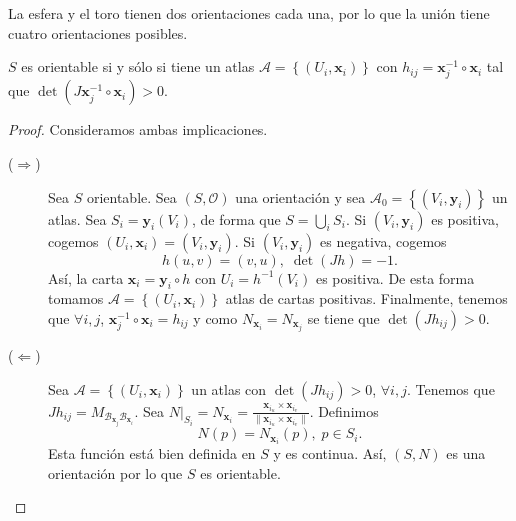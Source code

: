 \begin{observation}
La esfera y el toro tienen dos orientaciones cada una, por lo que la unión tiene cuatro orientaciones posibles. 
\end{observation}
\begin{theorem}
	$\displaystyle S $ es orientable si y sólo si tiene un atlas $\displaystyle \mathcal{A} = \left\{ \left(U_{i}, \textbf{x} _{i}\right)\right\}  $ con $\displaystyle h_{ij}= \textbf{x} _{j}^{-1}\circ \textbf{x} _{i} $ tal que $\displaystyle \det\left(J \textbf{x} _{j}^{-1} \circ \textbf{x} _{i}\right)>0 $.
\end{theorem}

\begin{proof}
Consideramos ambas implicaciones. 
\begin{description}
	\item[($\displaystyle \Rightarrow $)] Sea $\displaystyle S $ orientable. Sea $\displaystyle \left(S, \mathcal{O}\right) $ una orientación y sea $\displaystyle \mathcal{A}_{0}= \left\{ \left(V_{i}, \textbf{y} _{i}\right)\right\}  $ un atlas. Sea $\displaystyle S_{i} = \textbf{y} _{i}\left(V_{i}\right) $, de forma que $\displaystyle S = \bigcup_{i}S_{i} $. 
		Si $\displaystyle \left(V_{i}, \textbf{y} _{i}\right) $ es positiva, cogemos $\displaystyle \left(U_{i}, \textbf{x} _{i}\right)=\left(V_{i}, \textbf{y} _{i}\right) $. Si $\displaystyle \left(V_{i}, \textbf{y} _{i}\right) $ es negativa, cogemos 
		\[h\left(u,v\right)=\left(v,u\right), \; \det\left(Jh\right)=-1 .\]
		Así, la carta $\displaystyle \textbf{x} _{i}= \textbf{y} _{i} \circ h $ con $\displaystyle U_{i}=h^{-1}\left(V_{i}\right) $ es positiva. De esta forma tomamos $\displaystyle \mathcal{A} = \left\{ \left(U_{i}, \textbf{x} _{i}\right)\right\}  $ atlas de cartas positivas. Finalmente, tenemos que $\displaystyle \forall i,j  $, $\displaystyle \textbf{x} _{j}^{-1}\circ \textbf{x} _{i}=h_{ij} $ y como $\displaystyle N_{ \textbf{x} _{i}}= N_{ \textbf{x} _{j}} $ se tiene que $\displaystyle \det\left(Jh_{ij}\right)>0 $.
	\item[($\displaystyle \Leftarrow $)] Sea $\displaystyle \mathcal{A}= \left\{ \left(U_{i}, \textbf{x} _{i}\right)\right\}  $ un atlas con $\displaystyle \det\left(Jh_{ij}\right) > 0 $, $\displaystyle \forall i,j $. Tenemos que $\displaystyle Jh_{ij}= M_{\mathcal{B}_{ \textbf{x} _{j}}\mathcal{B}_{ \textbf{x} _{i}}} $. 
		Sea $\displaystyle N|_{S_{i}} = N_{ \textbf{x} _{i}} = \frac{ \textbf{x}_{i_{u}}  \times \textbf{x}_{i_{v}}}{\| \textbf{x} _{i_{u}} \times \textbf{x} _{i_{v}}\|} $. Definimos
		\[N\left(p\right)=
				N_{ \textbf{x} _{i}}\left(p\right), \; p \in S_{i}
			.\]
		Esta función está bien definida en $\displaystyle S $ y es continua. Así, $\displaystyle \left(S, N\right) $ es una orientación por lo que $\displaystyle S $ es orientable.
\end{description}
\end{proof}
